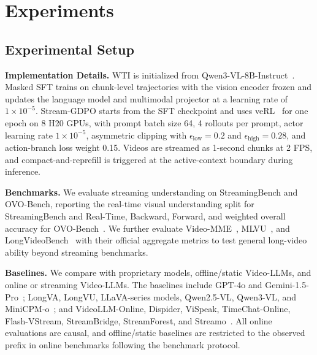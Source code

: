 \section{Experiments}

\subsection{Experimental Setup}



\noindent \textbf{Implementation Details.}
WTI is initialized from Qwen3-VL-8B-Instruct~\citep{qwen3vl2025}.
Masked SFT trains on chunk-level trajectories with the vision encoder frozen and updates the language model and multimodal projector at a learning rate of $1\times10^{-5}$.
Stream-GDPO starts from the SFT checkpoint and uses veRL~\citep{sheng2024hybridflow} for one epoch on 8 H20 GPUs, with prompt batch size 64, 4 rollouts per prompt, actor learning rate $1\times10^{-5}$, asymmetric clipping with $\epsilon_{\mathrm{low}}=0.2$ and $\epsilon_{\mathrm{high}}=0.28$, and action-branch loss weight 0.15.
Videos are streamed as 1-second chunks at 2 FPS, and compact-and-reprefill is triggered at the active-context boundary during inference.

\noindent \textbf{Benchmarks.}
We evaluate streaming understanding on StreamingBench and OVO-Bench, reporting the real-time visual understanding split for StreamingBench and Real-Time, Backward, Forward, and weighted overall accuracy for OVO-Bench~\citep{streamingbench2024,ovobench2025}.
We further evaluate Video-MME~\citep{videomme2025}, MLVU~\citep{mlvu2024}, and LongVideoBench~\citep{longvideobench2024} with their official aggregate metrics to test general long-video ability beyond streaming benchmarks.

\noindent \textbf{Baselines.}
We compare with proprietary models, offline/static Video-LLMs, and online or streaming Video-LLMs.
The baselines include GPT-4o and Gemini-1.5-Pro~\citep{openai_gpt4o2024,gemini15_2024}; LongVA, LongVU, LLaVA-series models, Qwen2.5-VL, Qwen3-VL, and MiniCPM-o~\citep{longva2024,longvu2025,llavaonevision2024,llavavideo2024,llavanextvideo2024,qwen25vl2025,qwen3vl2025,minicpmo45_2026}; and VideoLLM-Online, Dispider, ViSpeak, TimeChat-Online, Flash-VStream, StreamBridge, StreamForest, and Streamo~\citep{videollm_online2024,dispider2025,vispeak2025,timechat2024,flashvstream2025,streambridge2025,streamforest2025,streamo2026}.
All online evaluations are causal, and offline/static baselines are restricted to the observed prefix in online benchmarks following the benchmark protocol.

